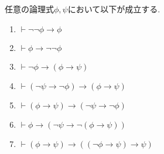  \begin{lemma}
  \label{rule1}
  任意の論理式$\phi,\psi$において以下が成立する.
  \begin{enumerate}
   \item $\vdash \lnot \lnot \phi \to \phi$
   \item $\vdash \phi \to \lnot \lnot \phi$
   \item $\vdash \lnot \phi \to (\phi \to \psi)$
   \item $\vdash (\lnot \psi \to \lnot \phi) \to (\phi \to \psi)$
   \item $\vdash (\phi \to \psi) \to (\lnot \psi \to \lnot \phi)$
   \item $\vdash \phi \to (\lnot \psi \to \lnot (\phi \to \psi))$
   \item $\vdash (\phi \to \psi) \to ((\lnot \phi \to \psi) \to \psi)$
  \end{enumerate}
 \end{lemma}

